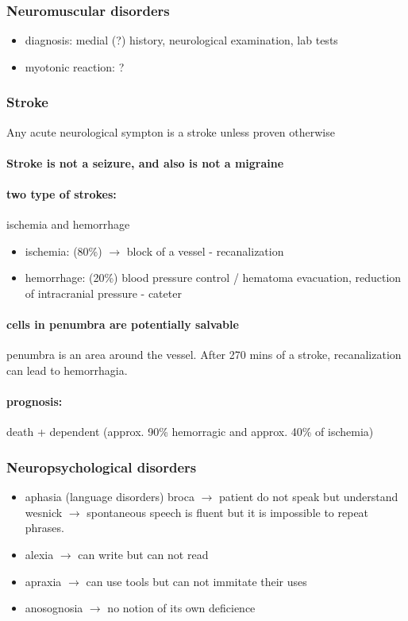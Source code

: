 \documentclass[12pt,article,oneside,a4paper]{memoir}
\begin{document}
\subsubsection{Neuromuscular disorders}
\begin{itemize}
\item diagnosis: medial (?) history, neurological examination, lab tests
\item myotonic reaction: ?
\end{itemize}

\subsubsection{Stroke} 
Any acute neurological sympton is a stroke unless proven otherwise
\paragraph{Stroke is not a seizure, and also is not a migraine}
\paragraph{two type of strokes:} ischemia and hemorrhage
\begin{itemize}
\item ischemia: (80\%) $\rightarrow$ block of a vessel - recanalization
\item hemorrhage: (20\%) blood pressure control / hematoma evacuation, reduction of intracranial pressure - cateter
\end{itemize}
\paragraph{cells in penumbra are potentially salvable} penumbra is an area around the vessel.
After 270 mins of a stroke, recanalization can lead to  hemorrhagia.
\paragraph{prognosis:} death + dependent (approx. 90\% hemorragic and approx. 40\% of ischemia)

\subsubsection{Neuropsychological disorders }
\begin{itemize}
\item aphasia (language disorders)
\subitem broca $\rightarrow$ patient do not speak but understand
\subitem wesnick $\rightarrow$ spontaneous speech is fluent but it is impossible to repeat phrases.
\item alexia $\rightarrow$ can write but can not read
\item apraxia $\rightarrow$ can use tools but can not immitate their uses
\item anosognosia $\rightarrow$ no notion of its own deficience
\end{itemize}
\end{document}
